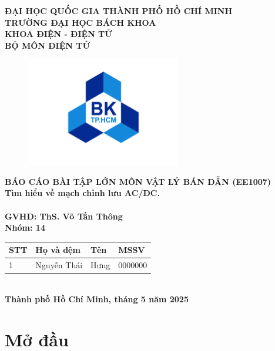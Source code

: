 \documentclass[a4paper,15pt]{article}
\begin{document}
\begin{titlepage}
    \centering
    {\textbf{ĐẠI HỌC QUỐC GIA THÀNH PHỐ HỒ CHÍ MINH}} \\   
    {\textbf{TRƯỜNG ĐẠI HỌC BÁCH KHOA}} \\   
    {\textbf{KHOA ĐIỆN - ĐIỆN TỬ}} \\
    {\textbf{BỘ MÔN ĐIỆN TỬ}}\\
\begin{figure}[h]
    \centering
    \includegraphics[width=0.6\textwidth]{img/Bach khoa.png}
\end{figure}
    {\textbf{BÁO CÁO BÀI TẬP LỚN MÔN VẬT LÝ BÁN DẪN (EE1007)}} \\
    \vspace{0.5cm}
    {\huge \textbf{Tìm hiểu về mạch chỉnh lưu AC/DC.}} \\
    \hrulefill \\
    
    { \textbf{GVHD: ThS. Võ Tấn Thông}} \\
    { \textbf{Nhóm: 14}} \\
    \vspace{0.5cm}

\begin{tabular}{|m{1cm}|m{3cm}|m{3cm}|m{2cm}|}
\hline
STT & Họ và đệm  & Tên &  MSSV \\ \hline
1 & Nguyễn Thái & Hưng & 0000000 \\ \hline
\end{tabular}
\vspace{7cm} \\
\textbf{Thành phố Hồ Chí Minh, tháng 5 năm 2025}
\end{titlepage}

\tableofcontents
\newpage

\section{Mở đầu}
\end{document}
